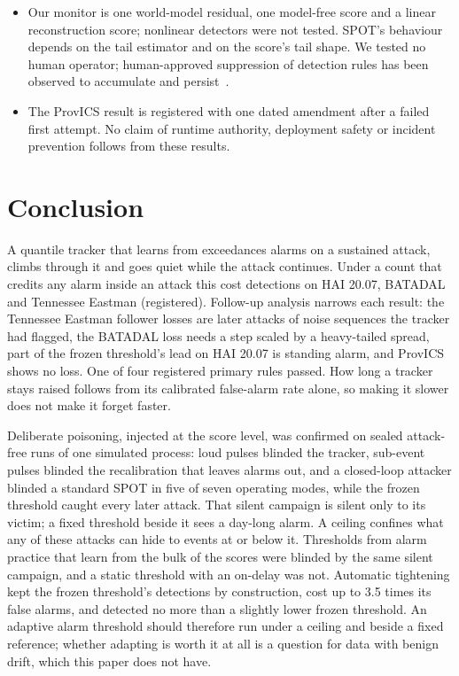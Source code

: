 \documentclass[letterpaper,twocolumn,10pt]{article}
\begin{document}
\begin{itemize}
  Tennessee Eastman and of the HAI development releases are unchanged (HAI 20.07, BATADAL and ProvICS
  were not rechecked), and the ProvICS validity mask (Section~\ref{sec:provics}). The other two, in
  the first smoothing window and in the hold-off tracker's episode counter, were not rechecked.
\item Our monitor is one world-model residual, one model-free score and a linear reconstruction score;
  nonlinear detectors were not tested. SPOT's behaviour depends on the tail estimator and on the
  score's tail shape. We tested no human operator; human-approved suppression of detection rules has
  been observed to accumulate and persist~\cite{dhananjeyan2026ratchet}.
\item The ProvICS result is registered with one dated amendment after a failed first attempt. No claim
  of runtime authority, deployment safety or incident prevention follows from these results.
\end{itemize}

\FloatBarrier
\section{Conclusion}

A quantile tracker that learns from exceedances alarms on a sustained attack, climbs through it and
goes quiet while the attack continues. Under a count that credits any alarm inside an attack this cost
detections on HAI 20.07, BATADAL and Tennessee Eastman (registered). Follow-up analysis narrows each
result: the Tennessee Eastman follower losses are later attacks of noise sequences the tracker had flagged, the
BATADAL loss needs a step scaled by a heavy-tailed spread, part of the frozen threshold's lead on HAI
20.07 is standing alarm, and ProvICS shows no loss. One of four registered primary rules passed. How
long a tracker stays raised follows from its calibrated false-alarm rate alone, so making it slower
does not make it forget faster.

Deliberate poisoning, injected at the score level, was confirmed on sealed attack-free runs of one
simulated process: loud pulses blinded the tracker, sub-event pulses blinded the recalibration that
leaves alarms out, and a closed-loop attacker blinded a standard SPOT in five of seven operating modes,
while the frozen threshold caught every later attack. That silent campaign is silent only to its
victim; a fixed threshold beside it sees a day-long alarm. A ceiling confines what any of these attacks
can hide to events at or below it. Thresholds from alarm practice that learn from the bulk of the
scores were blinded by the same silent campaign, and a static threshold with an on-delay was not.
Automatic tightening kept the frozen threshold's detections by
construction, cost up to 3.5 times its false alarms, and detected no more than a slightly lower frozen
threshold. An adaptive alarm threshold should therefore run under a ceiling and beside a fixed
reference; whether adapting is worth it at all is a question for data with benign drift, which this
paper does not have.
\end{document}
